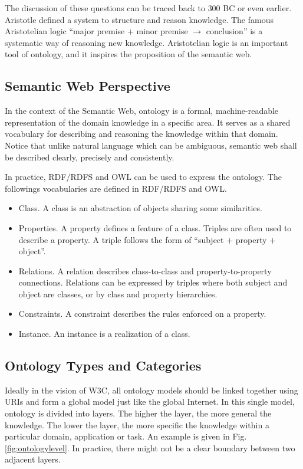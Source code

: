 The discussion of these questions can be traced back to $300$ BC or even earlier. Aristotle defined a system to structure and reason knowledge. The famous Aristotelian logic ``major premise + minor premise $\rightarrow$ conclusion'' is a systematic way of reasoning new knowledge. Aristotelian logic is an important tool of ontology, and it inspires the proposition of the semantic web.


\subsection{Semantic Web Perspective}

In the context of the Semantic Web, ontology is a formal, machine-readable representation of the domain knowledge in a specific area. It serves as a shared vocabulary for describing and reasoning the knowledge within that domain. Notice that unlike natural language which can be ambiguous, semantic web shall be described clearly, precisely and consistently.

In practice, RDF/RDFS and OWL can be used to express the ontology. The followings vocabularies are defined in RDF/RDFS and OWL.
\begin{itemize}
  \item Class. A class is an abstraction of objects sharing some similarities.
  \item Properties. A property defines a feature of a class. Triples are often used to describe a property. A triple follows the form of ``subject $+$ property $+$ object''.
  \item Relations. A relation describes class-to-class and property-to-property connections. Relations can be expressed by triples where both subject and object are classes, or by class and property hierarchies.
  \item Constraints. A constraint describes the rules enforced on a property.
  \item Instance. An instance is a realization of a class.
\end{itemize}

\subsection{Ontology Types and Categories}

Ideally in the vision of W3C, all ontology models should be linked together using URIs and form a global model just like the global Internet. In this single model, ontology is divided into layers. The higher the layer, the more general the knowledge. The lower the layer, the more specific the knowledge within a particular domain, application or task. An example is given in Fig. \ref{fig:ontologylevel}. In practice, there might not be a clear boundary between two adjacent layers.

